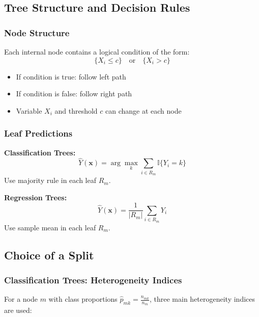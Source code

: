 \documentclass[12pt,a4paper]{article}
\begin{document}
\subsection{Tree Structure and Decision Rules}

\subsubsection{Node Structure}

Each internal node contains a logical condition of the form:
\begin{equation}
\{X_i \leq c\} \quad \text{or} \quad \{X_i > c\}
\end{equation}

\begin{itemize}
    \item If condition is true: follow left path
    \item If condition is false: follow right path
    \item Variable $X_i$ and threshold $c$ can change at each node
\end{itemize}

\subsubsection{Leaf Predictions}

\textbf{Classification Trees:}
\begin{equation}
\hat{Y}(\mathbf{x}) = \arg\max_k \sum_{i \in R_m} \mathbb{I}\{Y_i = k\}
\end{equation}
Use majority rule in each leaf $R_m$.

\textbf{Regression Trees:}
\begin{equation}
\hat{Y}(\mathbf{x}) = \frac{1}{|R_m|} \sum_{i \in R_m} Y_i
\end{equation}
Use sample mean in each leaf $R_m$.

\subsection{Choice of a Split}

\subsubsection{Classification Trees: Heterogeneity Indices}

For a node $m$ with class proportions $\hat{p}_{mk} = \frac{n_{mk}}{n_m}$, three main heterogeneity indices are used:
\end{document}
